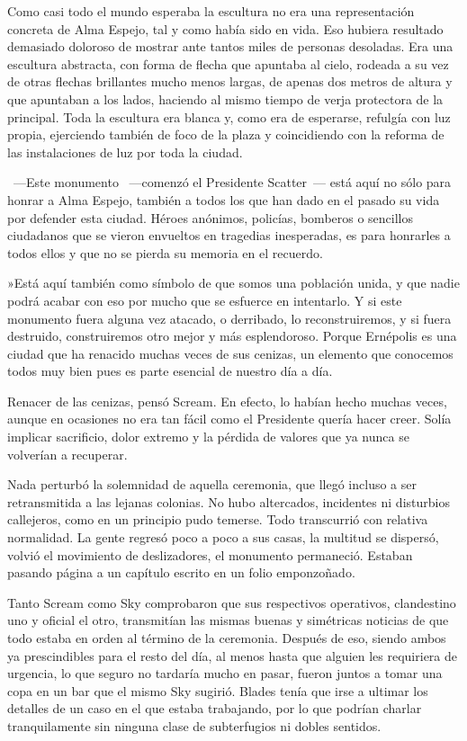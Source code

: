 Como casi todo el mundo esperaba la escultura no era una representación concreta de Alma Espejo, tal y como había sido en vida. Eso hubiera resultado demasiado doloroso de mostrar ante tantos miles de personas desoladas. Era una escultura abstracta, con forma de flecha que apuntaba al cielo, rodeada a su vez de otras flechas brillantes mucho menos largas, de apenas dos metros de altura y que apuntaban a los lados, haciendo al mismo tiempo de verja protectora de la principal. Toda la escultura era blanca y, como era de esperarse, refulgía con luz propia, ejerciendo también de foco de la plaza y coincidiendo con la reforma de las instalaciones de luz por toda la ciudad.

~---Este monumento ~---comenzó el Presidente Scatter~--- está aquí no sólo para honrar a Alma Espejo, también a todos los que han dado en el pasado su vida por defender esta ciudad. Héroes anónimos, policías, bomberos o sencillos ciudadanos que se vieron envueltos en tragedias inesperadas, es para honrarles a todos ellos y que no se pierda su memoria en el recuerdo.

»Está aquí también como símbolo de que somos una población unida, y que nadie podrá acabar con eso por mucho que se esfuerce en intentarlo. Y si este monumento fuera alguna vez atacado, o derribado, lo reconstruiremos, y si fuera destruido, construiremos otro mejor y más esplendoroso. Porque Ernépolis es una ciudad que ha renacido muchas veces de sus cenizas, un elemento que conocemos todos muy bien pues es parte esencial de nuestro día a día.

Renacer de las cenizas, pensó Scream. En efecto, lo habían hecho muchas veces, aunque en ocasiones no era tan fácil como el Presidente quería hacer creer. Solía implicar sacrificio, dolor extremo y la pérdida de valores que ya nunca se volverían a recuperar.

Nada perturbó la solemnidad de aquella ceremonia, que llegó incluso a ser retransmitida a las lejanas colonias. No hubo altercados, incidentes ni disturbios callejeros, como en un principio pudo temerse. Todo transcurrió con relativa normalidad. La gente regresó poco a poco a sus casas, la multitud se dispersó, volvió el movimiento de deslizadores, el monumento permaneció. Estaban pasando página a un capítulo escrito en un folio emponzoñado.

Tanto Scream como Sky comprobaron que sus respectivos operativos, clandestino uno y oficial el otro, transmitían las mismas buenas y simétricas noticias de que todo estaba en orden al término de la ceremonia. Después de eso, siendo ambos ya prescindibles para el resto del día, al menos hasta que alguien les requiriera de urgencia, lo que seguro no tardaría mucho en pasar, fueron juntos a tomar una copa en un bar que el mismo Sky sugirió. Blades tenía que irse a ultimar los detalles de un caso en el que estaba trabajando, por lo que podrían charlar tranquilamente sin ninguna clase de subterfugios ni dobles sentidos.

